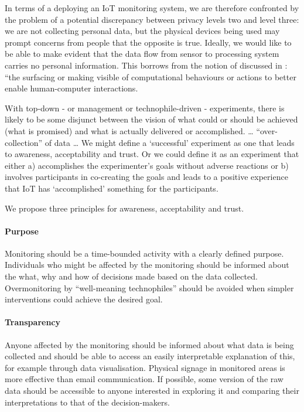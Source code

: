 In terms of a deploying an IoT monitoring system, we are therefore
confronted by the problem of a potential discrepancy between privacy
levels two and level three: we are not collecting personal data, but
the physical devices being used may prompt concerns from people that
the opposite is true. Ideally, we would like to be able to make
evident that the data flow from sensor to processing system carries no
personal information. This borrows from the notion of
 discussed in
\cite{Crabtree-2016-BAIT}: ``the surfacing or making visible of
computational behaviours or actions to better enable human-computer interactions.





With top-down - or management or technophile-driven - experiments,
there is likely to be some disjunct between the vision of what could
or should be achieved (what is promised) and what is actually
delivered or accomplished. … “over-collection” of data 
…
We might define a ‘successful’ experiment as one that leads to
awareness, acceptability and trust. Or we could define it as an
experiment that either a) accomplishes the experimenter’s goals
without adverse reactions or b) involves participants in co-creating
the goals and leads to a positive experience that IoT has
‘accomplished’ something for the participants.  

We propose three principles for awareness, acceptability and trust.

\paragraph{Purpose} Monitoring should be a time-bounded activity with
a clearly defined purpose. Individuals who might be affected by the
monitoring should be informed about the what, why and how of decisions
made based on the data collected. Overmonitoring by “well-meaning
technophiles” should be avoided when simpler interventions could
achieve the desired goal. 

\paragraph{Transparency} Anyone affected by the monitoring should be
informed about what data is being collected and should be able to
access an easily interpretable explanation of this, for example
through data visualisation. Physical signage in monitored areas is
more effective than email communication. If possible, some version of
the raw data should be accessible to anyone interested in exploring it
and comparing their interpretations to that of the decision-makers. 

